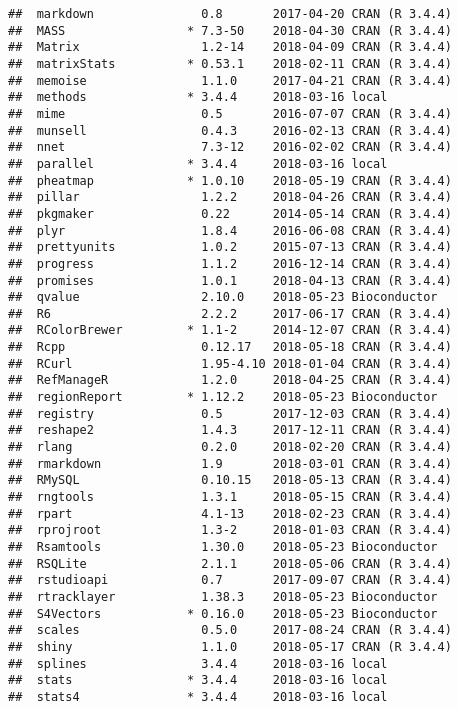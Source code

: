 \documentclass[]{article}
\begin{document}
\begin{verbatim}
##  markdown               0.8       2017-04-20 CRAN (R 3.4.4)
##  MASS                 * 7.3-50    2018-04-30 CRAN (R 3.4.4)
##  Matrix                 1.2-14    2018-04-09 CRAN (R 3.4.4)
##  matrixStats          * 0.53.1    2018-02-11 CRAN (R 3.4.4)
##  memoise                1.1.0     2017-04-21 CRAN (R 3.4.4)
##  methods              * 3.4.4     2018-03-16 local         
##  mime                   0.5       2016-07-07 CRAN (R 3.4.4)
##  munsell                0.4.3     2016-02-13 CRAN (R 3.4.4)
##  nnet                   7.3-12    2016-02-02 CRAN (R 3.4.4)
##  parallel             * 3.4.4     2018-03-16 local         
##  pheatmap             * 1.0.10    2018-05-19 CRAN (R 3.4.4)
##  pillar                 1.2.2     2018-04-26 CRAN (R 3.4.4)
##  pkgmaker               0.22      2014-05-14 CRAN (R 3.4.4)
##  plyr                   1.8.4     2016-06-08 CRAN (R 3.4.4)
##  prettyunits            1.0.2     2015-07-13 CRAN (R 3.4.4)
##  progress               1.1.2     2016-12-14 CRAN (R 3.4.4)
##  promises               1.0.1     2018-04-13 CRAN (R 3.4.4)
##  qvalue                 2.10.0    2018-05-23 Bioconductor  
##  R6                     2.2.2     2017-06-17 CRAN (R 3.4.4)
##  RColorBrewer         * 1.1-2     2014-12-07 CRAN (R 3.4.4)
##  Rcpp                   0.12.17   2018-05-18 CRAN (R 3.4.4)
##  RCurl                  1.95-4.10 2018-01-04 CRAN (R 3.4.4)
##  RefManageR             1.2.0     2018-04-25 CRAN (R 3.4.4)
##  regionReport         * 1.12.2    2018-05-23 Bioconductor  
##  registry               0.5       2017-12-03 CRAN (R 3.4.4)
##  reshape2               1.4.3     2017-12-11 CRAN (R 3.4.4)
##  rlang                  0.2.0     2018-02-20 CRAN (R 3.4.4)
##  rmarkdown              1.9       2018-03-01 CRAN (R 3.4.4)
##  RMySQL                 0.10.15   2018-05-13 CRAN (R 3.4.4)
##  rngtools               1.3.1     2018-05-15 CRAN (R 3.4.4)
##  rpart                  4.1-13    2018-02-23 CRAN (R 3.4.4)
##  rprojroot              1.3-2     2018-01-03 CRAN (R 3.4.4)
##  Rsamtools              1.30.0    2018-05-23 Bioconductor  
##  RSQLite                2.1.1     2018-05-06 CRAN (R 3.4.4)
##  rstudioapi             0.7       2017-09-07 CRAN (R 3.4.4)
##  rtracklayer            1.38.3    2018-05-23 Bioconductor  
##  S4Vectors            * 0.16.0    2018-05-23 Bioconductor  
##  scales                 0.5.0     2017-08-24 CRAN (R 3.4.4)
##  shiny                  1.1.0     2018-05-17 CRAN (R 3.4.4)
##  splines                3.4.4     2018-03-16 local         
##  stats                * 3.4.4     2018-03-16 local         
##  stats4               * 3.4.4     2018-03-16 local         

\end{verbatim}
\end{document}
